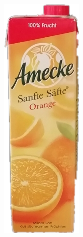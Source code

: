 \documentclass[a4paper,12pt,oneside]{article}
\begin{document}
\begin{figure}[htb]
\begin{minipage}[c]{0.08\textwidth}
\includegraphics[width=\textwidth]{Sources/Bild2_GW.png}

\end{minipage}
\end{figure}
\end{document}
